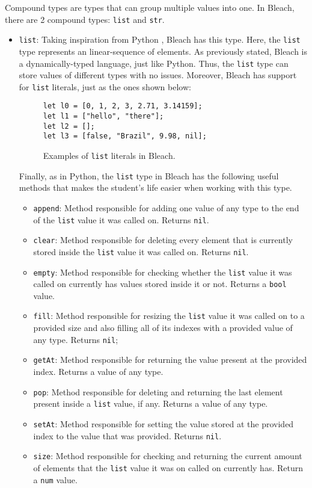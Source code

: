 Compound types are types that can group multiple values into one. In Bleach, there are 2 compound types: \texttt{list} and \texttt{str}.
\begin{itemize}
    \item \texttt{list}: Taking inspiration from Python \cite{python_language}, Bleach has this type. Here, the \texttt{list} type represents an linear-sequence of elements. As previously stated, Bleach is a dynamically-typed language, just like Python. Thus, the \texttt{list} type can store values of different types with no issues. Moreover, Bleach has support for \texttt{list} literals, just as the ones shown below:\newline

    \begin{figure}[H]
        \centering
        \begin{lstlisting}
let l0 = [0, 1, 2, 3, 2.71, 3.14159];
let l1 = ["hello", "there"];
let l2 = [];
let l3 = [false, "Brazil", 9.98, nil];
        \end{lstlisting}
        \caption{Examples of \texttt{list} literals in Bleach.}
    \end{figure}

    Finally, as in Python, the \texttt{list} type in Bleach has the following useful methods that makes the student's life easier when working with this type.
    
    \begin{itemize}
        \item \texttt{append}: Method responsible for adding one value of any type to the end of the \texttt{list} value it was called on. Returns \texttt{nil}.
        \item \texttt{clear}: Method responsible for deleting every element that is currently stored inside the \texttt{list} value it was called on. Returns \texttt{nil}.
        \item \texttt{empty}: Method responsible for checking whether the \texttt{list} value it was called on currently has values stored inside it or not. Returns a \texttt{bool} value.
        \item \texttt{fill}: Method responsible for resizing the \texttt{list} value it was called on to a provided size and also filling all of its indexes with a provided value of any type. Returns \texttt{nil}; 
        \item \texttt{getAt}: Method responsible for returning the value present at the provided index. Returns a value of any type.
        \item \texttt{pop}: Method responsible for deleting and returning the last element present inside a \texttt{list} value, if any. Returns a value of any type.
        \item \texttt{setAt}: Method responsible for setting the value stored at the provided index to the value that was provided. Returns \texttt{nil}.
        \item \texttt{size}: Method responsible for checking and returning the current amount of elements that the \texttt{list} value it was on called on currently has. Return a \texttt{num} value.
    \end{itemize}


\end{itemize}
